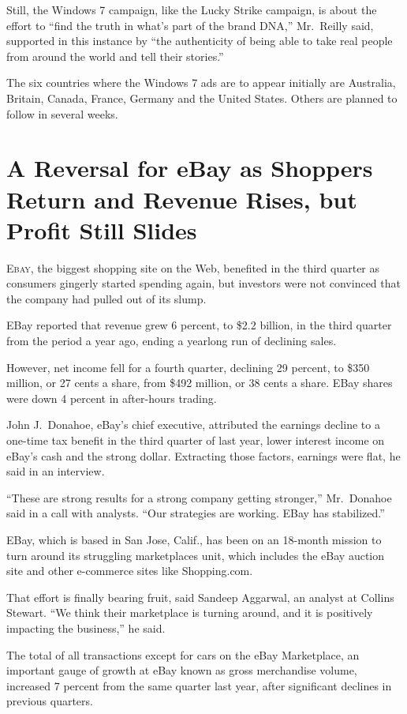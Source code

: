 ﻿\documentclass[12pt]{article}
\begin{document}
Still, the Windows 7 campaign, like the Lucky Strike campaign, is about the effort to ``find the
truth in what's part of the brand DNA,'' Mr.~Reilly said, supported in this instance by ``the
authenticity of being able to take real people from around the world and tell their stories.''

The six countries where the Windows 7 ads are to appear initially are Australia, Britain, Canada,
France, Germany and the United States. Others are planned to follow in several weeks.

\section{A Reversal for eBay as Shoppers Return and Revenue Rises, but Profit Still Slides}

\lettrine{E}{bay}, the biggest shopping site on the Web, benefited in the
third quarter as consumers gingerly started spending again, but investors were not convinced that
the company had pulled out of its slump.

EBay reported that revenue grew 6 percent, to \$2.2 billion, in the third quarter from the period a
year ago, ending a yearlong run of declining sales.

However, net income fell for a fourth quarter, declining 29 percent, to \$350 million, or 27 cents a
share, from \$492 million, or 38 cents a share. EBay shares were down 4 percent in after-hours
trading.

John J.~Donahoe, eBay's chief executive, attributed the earnings decline to a one-time tax benefit
in the third quarter of last year, lower interest income on eBay's cash and the strong dollar.
Extracting those factors, earnings were flat, he said in an interview.

``These are strong results for a strong company getting stronger,'' Mr.~Donahoe said in a call with
analysts. ``Our strategies are working. EBay has stabilized.''

EBay, which is based in San Jose, Calif., has been on an 18-month mission to turn around its
struggling marketplaces unit, which includes the eBay auction site and other e-commerce sites like
Shopping.com.

That effort is finally bearing fruit, said Sandeep Aggarwal, an analyst at Collins Stewart. ``We
think their marketplace is turning around, and it is positively impacting the business,'' he said.

The total of all transactions except for cars on the eBay Marketplace, an important gauge of growth
at eBay known as gross merchandise volume, increased 7 percent from the same quarter last year,
after significant declines in previous quarters.
\end{document}
